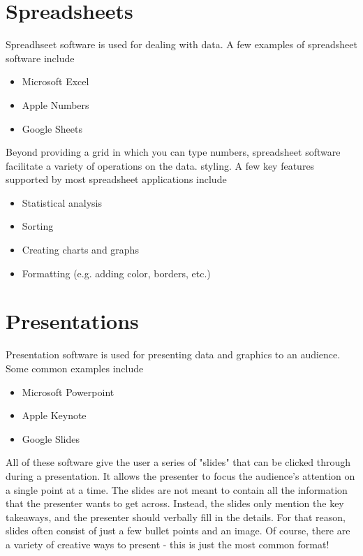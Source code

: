 
\section{Spreadsheets}

Spreadhseet software is used for dealing with data. A few examples of spreadsheet software include
\begin{itemize}
	\item Microsoft Excel
	\item Apple Numbers
	\item Google Sheets
\end{itemize}

Beyond providing a grid in which you can type numbers, spreadsheet software facilitate a variety of operations on the data. styling. A few key features supported by most spreadsheet applications include
\begin{itemize}
	\item Statistical analysis
	\item Sorting
	\item Creating charts and graphs
	\item Formatting (e.g. adding color, borders, etc.)
\end{itemize}


\section{Presentations}

Presentation software is used for presenting data and graphics to an audience. Some common examples include
\begin{itemize}
	\item Microsoft Powerpoint
	\item Apple Keynote
	\item Google Slides
\end{itemize}

All of these software give the user a series of "slides" that can be clicked through during a presentation. It allows the presenter to focus the audience's attention on a single point at a time. The slides are not meant to contain all the information that the presenter wants to get across. Instead, the slides only mention the key takeaways, and the presenter should verbally fill in the details. For that reason, slides often consist of just a few bullet points and an image. Of course, there are a variety of creative ways to present - this is just the most common format!

